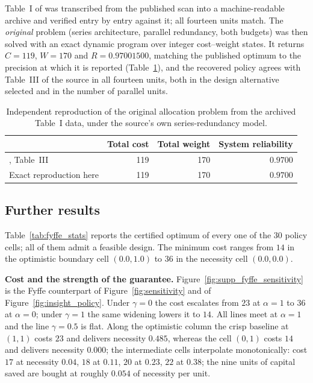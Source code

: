 \documentclass[11pt]{article}
\newcommand{\new}[1]{#1}
\begin{document}
Table~I of \citet{Fyffe1968} was transcribed from the published scan into a machine-readable archive
and verified entry by entry against it; all fourteen units match. The \emph{original} problem (series
architecture, parallel redundancy, both budgets) was then solved with an exact dynamic program over
integer cost--weight states. It returns $C = 119$, $W = 170$ and $R = 0.97001500$, matching the
published optimum to the precision at which it is reported (Table~\ref{tab:fyffe_source}), and the
recovered policy agrees with Table~III of the source in all fourteen units, both in the design
alternative selected and in the number of parallel units.

\begin{table}[htbp]
\centering
\caption{Independent reproduction of the original \citet{Fyffe1968} allocation problem from the
archived Table~I data, under the source's own series-redundancy model.}
\label{tab:fyffe_source}
\small
\begin{tabular}{lrrr}
\hline
 & Total cost & Total weight & System reliability\\
\hline
\citet{Fyffe1968}, Table~III & 119 & 170 & $0.9700$\\
Exact reproduction here & 119 & 170 & $0.9700$\\
\hline
\end{tabular}
\end{table}

\subsection{Further results}


Table~\ref{tab:fyffe_stats} reports the certified optimum of every one of the $30$ policy cells; all of them admit a feasible design. \new{The minimum cost ranges from $14$ in the optimistic boundary cell $(0.0, 1.0)$ to $36$ in the necessity cell $(0.0, 0.0)$.}

\textbf{Cost and the strength of the guarantee.} Figure~\ref{fig:supp_fyffe_sensitivity} is the Fyffe counterpart of Figure~\ref{fig:sensitivity} and of Figure~\ref{fig:insight_policy}. Under $\gamma=0$ the cost escalates from $23$ at $\alpha=1$ to $36$ at $\alpha=0$; under $\gamma=1$ the same widening lowers it to $14$. All lines meet at $\alpha=1$ and the line $\gamma=0.5$ is flat. Along the optimistic column the crisp baseline at $(1,1)$ costs $23$ and delivers necessity $0.485$, whereas the cell $(0,1)$ costs $14$ and delivers necessity $0.000$; the intermediate cells interpolate monotonically: cost $17$ at necessity $0.04$, $18$ at $0.11$, $20$ at $0.23$, $22$ at $0.38$; the nine units of capital saved are bought at roughly $0.054$ of necessity per unit.
\end{document}
